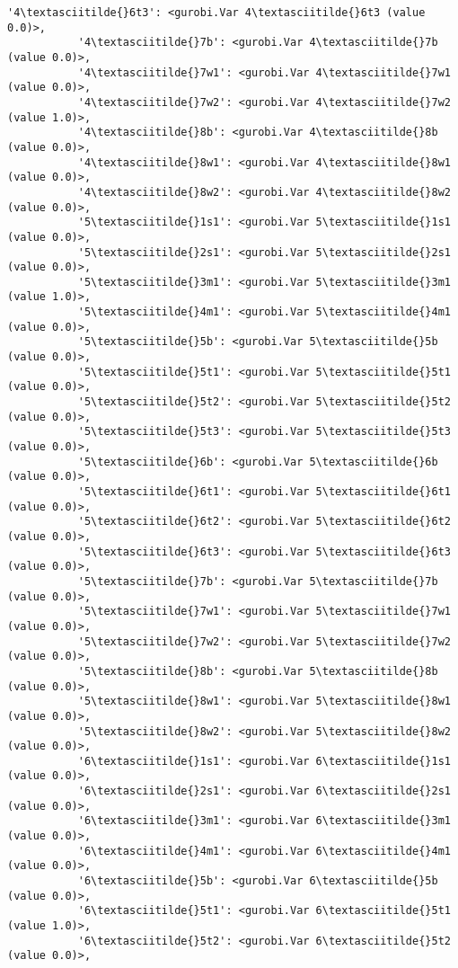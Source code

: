 \documentclass[11pt]{article}
\begin{document}
\begin{Verbatim}[commandchars=\\\{\}]
           '4\textasciitilde{}6t3': <gurobi.Var 4\textasciitilde{}6t3 (value 0.0)>,
           '4\textasciitilde{}7b': <gurobi.Var 4\textasciitilde{}7b (value 0.0)>,
           '4\textasciitilde{}7w1': <gurobi.Var 4\textasciitilde{}7w1 (value 0.0)>,
           '4\textasciitilde{}7w2': <gurobi.Var 4\textasciitilde{}7w2 (value 1.0)>,
           '4\textasciitilde{}8b': <gurobi.Var 4\textasciitilde{}8b (value 0.0)>,
           '4\textasciitilde{}8w1': <gurobi.Var 4\textasciitilde{}8w1 (value 0.0)>,
           '4\textasciitilde{}8w2': <gurobi.Var 4\textasciitilde{}8w2 (value 0.0)>,
           '5\textasciitilde{}1s1': <gurobi.Var 5\textasciitilde{}1s1 (value 0.0)>,
           '5\textasciitilde{}2s1': <gurobi.Var 5\textasciitilde{}2s1 (value 0.0)>,
           '5\textasciitilde{}3m1': <gurobi.Var 5\textasciitilde{}3m1 (value 1.0)>,
           '5\textasciitilde{}4m1': <gurobi.Var 5\textasciitilde{}4m1 (value 0.0)>,
           '5\textasciitilde{}5b': <gurobi.Var 5\textasciitilde{}5b (value 0.0)>,
           '5\textasciitilde{}5t1': <gurobi.Var 5\textasciitilde{}5t1 (value 0.0)>,
           '5\textasciitilde{}5t2': <gurobi.Var 5\textasciitilde{}5t2 (value 0.0)>,
           '5\textasciitilde{}5t3': <gurobi.Var 5\textasciitilde{}5t3 (value 0.0)>,
           '5\textasciitilde{}6b': <gurobi.Var 5\textasciitilde{}6b (value 0.0)>,
           '5\textasciitilde{}6t1': <gurobi.Var 5\textasciitilde{}6t1 (value 0.0)>,
           '5\textasciitilde{}6t2': <gurobi.Var 5\textasciitilde{}6t2 (value 0.0)>,
           '5\textasciitilde{}6t3': <gurobi.Var 5\textasciitilde{}6t3 (value 0.0)>,
           '5\textasciitilde{}7b': <gurobi.Var 5\textasciitilde{}7b (value 0.0)>,
           '5\textasciitilde{}7w1': <gurobi.Var 5\textasciitilde{}7w1 (value 0.0)>,
           '5\textasciitilde{}7w2': <gurobi.Var 5\textasciitilde{}7w2 (value 0.0)>,
           '5\textasciitilde{}8b': <gurobi.Var 5\textasciitilde{}8b (value 0.0)>,
           '5\textasciitilde{}8w1': <gurobi.Var 5\textasciitilde{}8w1 (value 0.0)>,
           '5\textasciitilde{}8w2': <gurobi.Var 5\textasciitilde{}8w2 (value 0.0)>,
           '6\textasciitilde{}1s1': <gurobi.Var 6\textasciitilde{}1s1 (value 0.0)>,
           '6\textasciitilde{}2s1': <gurobi.Var 6\textasciitilde{}2s1 (value 0.0)>,
           '6\textasciitilde{}3m1': <gurobi.Var 6\textasciitilde{}3m1 (value 0.0)>,
           '6\textasciitilde{}4m1': <gurobi.Var 6\textasciitilde{}4m1 (value 0.0)>,
           '6\textasciitilde{}5b': <gurobi.Var 6\textasciitilde{}5b (value 0.0)>,
           '6\textasciitilde{}5t1': <gurobi.Var 6\textasciitilde{}5t1 (value 1.0)>,
           '6\textasciitilde{}5t2': <gurobi.Var 6\textasciitilde{}5t2 (value 0.0)>,

\end{Verbatim}
\end{document}

